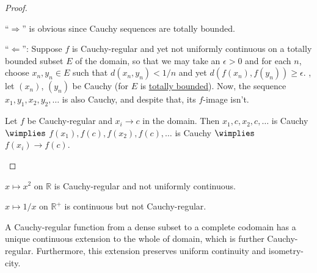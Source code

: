 	\begin{proof}
		\begin{mylist}
			\item ``$\Rightarrow$'' is obvious since Cauchy sequences are totally bounded.
			
			``$\Leftarrow$'': Suppose $f$ is Cauchy-regular and yet not uniformly continuous on a totally bounded subset $E$ of the domain, so that we may take an $\epsilon > 0$ and for each $n$, choose
			$x_n, y_n\in E$ such that $d(x_n, y_n) < 1/n$ and yet $d(f(x_n), f(y_n)) \ge \epsilon$. \Wlogg, let $(x_n)$, $(y_n)$ be Cauchy (for $E$ is \ul{totally bounded}). Now, the sequence $x_1, y_1, x_2, y_2, \ldots$ is also Cauchy, and despite that, its $f$-image isn't.
			
			
			\item Let $f$ be Cauchy-regular and $x_i\to c$ in the domain. Then $x_1, c, x_2, c, \ldots$ is Cauchy $\wimplies$ $f(x_1), f(c), f(x_2), f(c), \ldots$ is Cauchy $\wimplies$ $f(x_i)\to f(c)$.\qedhere
		\end{mylist}
	\end{proof}
	
	\begin{rmk}
		\begin{rmklist}
			\item $x\mapsto x^2$ on $\mathbb R$ is Cauchy-regular and not uniformly continuous.
			
			\item $x\mapsto 1/x$ on $\mathbb R^+$ is continuous but not Cauchy-regular.
		\end{rmklist}
	\end{rmk}
	
	
	\begin{thm}\label{THM: extension of Chauchy-regs}
		A Cauchy-regular function from a dense subset to a complete codomain has a unique continuous extension to the whole of domain, which is further Cauchy-regular. Furthermore, this extension preserves uniform continuity and isometry-city.
	\end{thm}
	
